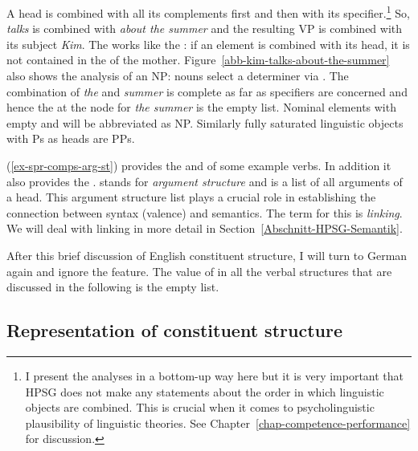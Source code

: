 A head is combined with all its complements first and then with its specifier.\footnote{%
  I present the analyses in a bottom-up way here but it is very important that HPSG does not make
  any statements about the order in which linguistic objects are combined. This is crucial when it
  comes to psycholinguistic plausibility of linguistic theories. See Chapter~\ref{chap-competence-performance} for discussion.%
} So, \emph{talks} is combined with \emph{about the summer} and the resulting VP is combined with
its subject \emph{Kim}. The \sprl works like the \compsl: if an element is combined with its head,
it is not contained in the \sprl of the mother. Figure~\ref{abb-kim-talks-about-the-summer} also
shows the analysis of an NP: nouns select a determiner via \spr. The combination of \emph{the} and
\emph{summer} is complete as far as specifiers are concerned and hence the \sprl at the node for
\emph{the summer} is the empty list. Nominal elements with empty \sprl and \compsl will be
abbreviated as NP. Similarly fully saturated linguistic objects with Ps as heads are PPs.

(\ref{ex-spr-comps-arg-st}) provides the \spr and \compsvs of some example verbs. In addition it
also provides the \argstv. \argst{} stands for \emph{argument structure} and is a list of all
arguments of a head. This argument structure list plays a crucial role in establishing the
connection between syntax (valence) and semantics. The term for this is
\emph{linking}. We will deal with linking in more detail in Section~\ref{Abschnitt-HPSG-Semantik}.

After this brief discussion of English constituent structure, I will turn to German again and ignore
the \spr feature. The value of \spr in all the verbal structures that are discussed in the following is the
empty list.

\subsection{Representation of constituent structure}
\label{sec-HPSG-constituent-structure}

